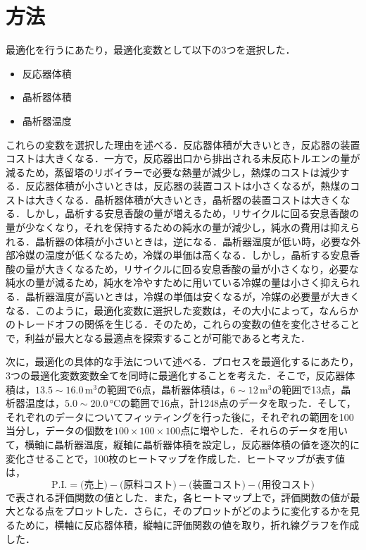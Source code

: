\documentclass[a4j]{jsreport}
\begin{document}
\section{方法}
最適化を行うにあたり，最適化変数として以下の3つを選択した．
\begin{itemize}
  \item 反応器体積
  \item 晶析器体積
  \item 晶析器温度
\end{itemize}

これらの変数を選択した理由を述べる．反応器体積が大きいとき，反応器の装置コストは大きくなる．一方で，反応器出口から排出される未反応トルエンの量が減るため，蒸留塔のリボイラーで必要な熱量が減少し，熱煤のコストは減少する．反応器体積が小さいときは，反応器の装置コストは小さくなるが，熱煤のコストは大きくなる．晶析器体積が大きいとき，晶析器の装置コストは大きくなる．しかし，晶析する安息香酸の量が増えるため，リサイクルに回る安息香酸の量が少なくなり，それを保持するための純水の量が減少し，純水の費用は抑えられる．晶析器の体積が小さいときは，逆になる．晶析器温度が低い時，必要な外部冷媒の温度が低くなるため，冷媒の単価は高くなる．しかし，晶析する安息香酸の量が大きくなるため，リサイクルに回る安息香酸の量が小さくなり，必要な純水の量が減るため，純水を冷やすために用いている冷媒の量は小さく抑えられる．晶析器温度が高いときは，冷媒の単価は安くなるが，冷媒の必要量が大きくなる．このように，最適化変数に選択した変数は，その大小によって，なんらかのトレードオフの関係を生じる．そのため，これらの変数の値を変化させることで，利益が最大となる最適点を探索することが可能であると考えた．

次に，最適化の具体的な手法について述べる．プロセスを最適化するにあたり，3つの最適化変数変数全てを同時に最適化することを考えた．そこで，反応器体積は，$13.5 \sim 16.0 \, \si{\cubic \metre}$の範囲で6点，晶析器体積は，$6 \sim 12 \, \si{\cubic \metre}$の範囲で13点，晶析器温度は，$5.0 \sim 20.0 \, \si{\degreeCelsius}$の範囲で16点，計1248点のデータを取った．そして，それぞれのデータについてフィッティングを行った後に，それぞれの範囲を100当分し，データの個数を$100 \times 100 \times 100$点に増やした．それらのデータを用いて，横軸に晶析器温度，縦軸に晶析器体積を設定し，反応器体積の値を逐次的に変化させることで，100枚のヒートマップを作成した．ヒートマップが表す値は，
\begin{equation}
  \text{P.I.} = \text{(売上)} - \text{(原料コスト)} - \text{(装置コスト)} -\text{(用役コスト)}
\end{equation}
で表される評価関数の値とした．また，各ヒートマップ上で，評価関数の値が最大となる点をプロットした．さらに，そのプロットがどのように変化するかを見るために，横軸に反応器体積，縦軸に評価関数の値を取り，折れ線グラフを作成した．
\end{document}
